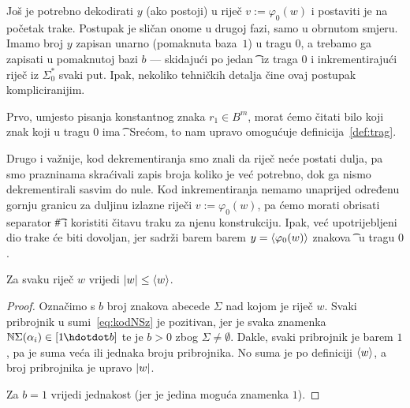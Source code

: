 
Još je potrebno dekodirati $y$ (ako postoji) u riječ $v:=\varphi_0(w)$ i postaviti je na početak trake.
Postupak je sličan onome u drugoj fazi, samo u obrnutom smjeru. Imamo broj $y$ zapisan unarno (pomaknuta baza~$1$) u tragu $0$, a trebamo ga zapisati u pomaknutoj bazi $b$ --- skidajući po jedan \t\textbullet\ iz traga $0$ i inkrementirajući riječ iz $\Sigma_0^*$ svaki put. Ipak, nekoliko tehničkih detalja čine ovaj postupak kompliciranijim.

Prvo, umjesto pisanja konstantnog znaka $r_1\in B^m$, morat ćemo čitati bilo koji znak koji u tragu $0$ ima \t\textbullet. Srećom, to nam upravo omogućuje definicija~\ref{def:trag}.

Drugo i važnije, kod dekrementiranja smo znali da riječ neće postati dulja, pa smo prazninama skraćivali zapis broja koliko je već potrebno, dok ga nismo dekrementirali sasvim do nule. Kod inkrementiranja nemamo unaprijed određenu gornju granicu za duljinu izlazne riječi $v:=\varphi_0(w)$, pa ćemo morati obrisati separator \t\# i koristiti čitavu traku za njenu konstrukciju. Ipak, već upotrijebljeni dio trake će biti dovoljan, jer sadrži barem barem $y=\langle\varphi_0(w)\rangle$ znakova \t\textbullet\ u tragu $0$.

\begin{lema}[{name=[duljina riječi nije veća od koda riječi]}]\label{lm:dulj<=kr}
Za svaku riječ $w$ vrijedi $\lvert w\rvert\le\langle w\rangle$.
\end{lema}
\begin{proof}
Označimo s $b$ broj znakova abecede $\Sigma$ nad kojom je riječ $w$.
	Svaki pribrojnik u sumi~\eqref{eq:kodNSz} je pozitivan, jer je svaka znamenka $\N\Sigma(\alpha_i)\in[1\mspace{-1mu}\dd b]$ te je $b>0$ zbog $\Sigma\ne\emptyset$. Dakle, svaki pribrojnik je barem $1$, pa je suma veća ili jednaka broju pribrojnika. No suma je po definiciji $\langle w\rangle$, a broj pribrojnika je upravo $\lvert w\rvert$.

Za $b=1$ vrijedi jednakost (jer je jedina moguća znamenka $1$).
\end{proof}


